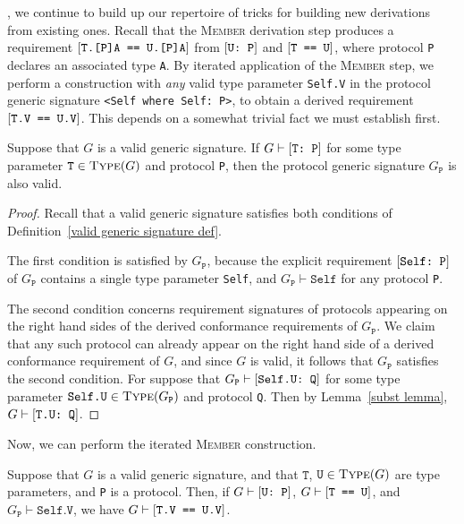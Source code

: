 \documentclass[../generics]{subfiles}
\begin{document}
, we continue to build up our repertoire of tricks for building new derivations from existing ones. Recall that the \textsc{Member} derivation step produces a requirement $[\texttt{T.[P]A == U.[P]A}]$ from $[\texttt{U:~P}]$ and $[\texttt{T == U}]$, where protocol \texttt{P} declares an associated type \texttt{A}. By iterated application of the \textsc{Member} step, we perform a construction with \emph{any} valid type parameter \texttt{Self.V} in the protocol generic signature \verb|<Self where Self: P>|, to obtain a derived requirement $[\texttt{T.V == U.V}]$. This depends on a somewhat trivial fact we must establish first.
\begin{proposition}\label{protocol generic signature valid}
Suppose that $G$ is a valid generic signature. If $G\vdash[\texttt{T:~P}]$ for some type parameter $\texttt{T}\in\textsc{Type}({G})$ and protocol \texttt{P}, then the protocol generic signature $G_\texttt{P}$ is also valid.
\end{proposition}
\begin{proof}
Recall that a valid generic signature satisfies both conditions of Definition~\ref{valid generic signature def}.

The first condition is satisfied by $G_\texttt{P}$, because the explicit requirement $[\texttt{Self:~P}]$ of $G_\texttt{P}$ contains a single type parameter \texttt{Self}, and $G_\texttt{P}\vdash\texttt{Self}$ for any protocol \texttt{P}.

The second condition concerns requirement signatures of protocols appearing on the right hand sides of the derived conformance requirements of $G_\texttt{P}$. We claim that any such protocol can already appear on the right hand side of a derived conformance requirement of $G$, and since $G$ is valid, it follows that $G_\texttt{P}$ satisfies the second condition. For suppose that $G_\texttt{P}\vdash[\texttt{Self.U:~Q}]$ for some type parameter $\texttt{Self.U}\in\textsc{Type}({G_\texttt{P}})$ and protocol \texttt{Q}. Then by Lemma~\ref{subst lemma}, $G\vdash[\texttt{T.U:~Q}]$.
\end{proof}
Now, we can perform the iterated \textsc{Member} construction.
\begin{proposition}\label{general member type}
Suppose that $G$ is a valid generic signature, and that $\texttt{T}$, $\texttt{U}\in\textsc{Type}({G})$ are type parameters, and \texttt{P} is a protocol. Then, if $G\vdash[\texttt{U:~P}]$, $G\vdash[\texttt{T == U}]$, and $G_\texttt{P}\vdash\texttt{Self.V}$, we have $G\vdash[\texttt{T.V == U.V}]$.
\end{proposition}
\end{document}
